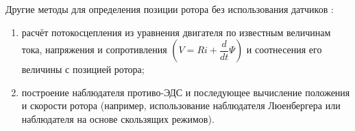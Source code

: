 Другие методы для определения позиции ротора без использования датчиков \cite{art:bldc_sensorless}:
\begin{enumerate}
	\item расчёт потокосцепления из уравнения двигателя по известным величинам тока, напряжения и сопротивления $\left(V=Ri+\dfrac{d}{dt}\Psi\right)$ и соотнесения его величины с позицией ротора;
	\item построение наблюдателя противо-ЭДС и последующее вычисление положения и скорости ротора (например, использование наблюдателя Люенбергера или наблюдателя на основе скользящих режимов).
\end{enumerate}



